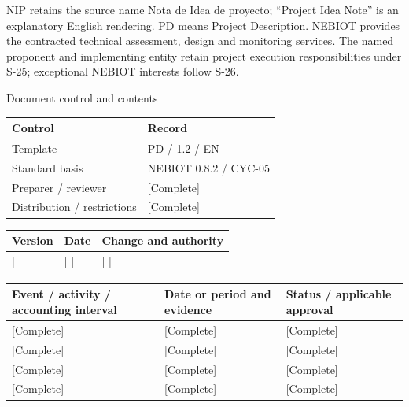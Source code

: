 \vspace{2mm}
NIP retains the source name Nota de Idea de proyecto; “Project Idea Note” is an explanatory English rendering. PD means Project Description.
\vspace{2mm}
NEBIOT provides the contracted technical assessment, design and monitoring services. The named proponent and implementing entity retain project execution responsibilities under S-25; exceptional NEBIOT interests follow S-26.
\clearpage
{\fontsize{23}{27}\selectfont\color{NEBGreen}Document control and contents\par}
\vspace{3mm}
{\sffamily\fontsize{8.3}{10.3}\selectfont\begin{longtable}{@{}P{50.55mm} P{117.94mm}@{}}
\toprule
\textbf{Control} & \textbf{Record}\\\midrule\endhead
\rule{0pt}{7.7mm}Template & PD / 1.2 / EN\\\hline
\rule{0pt}{7.7mm}Standard basis & NEBIOT 0.8.2 / CYC-05\\\hline
\rule{0pt}{7.7mm}Preparer / reviewer & [Complete]\\\hline
\rule{0pt}{7.7mm}Distribution / restrictions & [Complete]\\\hline
\end{longtable}}
{\sffamily\fontsize{8.3}{10.3}\selectfont\begin{longtable}{@{}P{31.34mm} P{37.94mm} P{95.68mm}@{}}
\toprule
\textbf{Version} & \textbf{Date} & \textbf{Change and authority}\\\midrule\endhead
\rule{0pt}{7.7mm}[ ] & [ ] & [ ]\\\hline
\end{longtable}}
{\sffamily\fontsize{9.5}{11.4}\selectfont\tableofcontents}
{\sffamily\fontsize{8.3}{10.3}\selectfont\begin{longtable}{@{}P{61.14mm} P{54.44mm} P{49.49mm}@{}}
\toprule
\textbf{Event / activity / accounting interval} & \textbf{Date or period and evidence} & \textbf{Status / applicable approval}\\\midrule\endhead
\rule{0pt}{7.7mm}[Complete] & [Complete] & [Complete]\\\hline
\rule{0pt}{7.7mm}[Complete] & [Complete] & [Complete]\\\hline
\rule{0pt}{7.7mm}[Complete] & [Complete] & [Complete]\\\hline
\rule{0pt}{7.7mm}[Complete] & [Complete] & [Complete]\\\hline
\end{longtable}}
